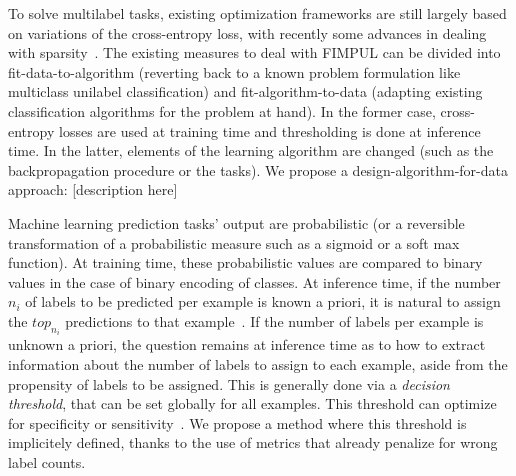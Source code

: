 
To solve multilabel tasks, existing optimization frameworks are still largely based on variations of the cross-entropy loss, with recently some advances in dealing with sparsity~\citep[see, e.g.,][]{focalLoss,tencent}. The existing measures to deal with FIMPUL can be divided into fit-data-to-algorithm (reverting back to a known problem formulation like multiclass unilabel classification) and fit-algorithm-to-data (adapting existing classification algorithms for the problem at hand). In the former case, cross-entropy losses are used at training time and thresholding is done at inference time. In the latter, elements of the learning algorithm are changed (such as the backpropagation procedure or the tasks). We propose a design-algorithm-for-data approach: [description here]

Machine learning prediction tasks' output are probabilistic (or a reversible transformation of a probabilistic measure such as a sigmoid or a soft max function). At training time, these probabilistic values are compared to binary values in the case of binary encoding of classes. At inference time, if the number $n_i$ of labels to be predicted per example is known a priori, it is natural to assign the $top_{n_i}$ predictions to that example~\cite{lossTopKError, topKmulticlassSVM}. If the number of labels per example is unknown a priori, the question remains at inference time as to how to extract information about the number of labels to assign to each example, aside from the propensity of labels to be assigned. This is generally done via a \emph{decision threshold}, that can be set globally for all examples. This threshold can optimize for specificity or sensitivity~\cite{decisionThreshold}. We propose a method where this threshold is implicitely defined, thanks to the use of metrics that already penalize for wrong label counts.

